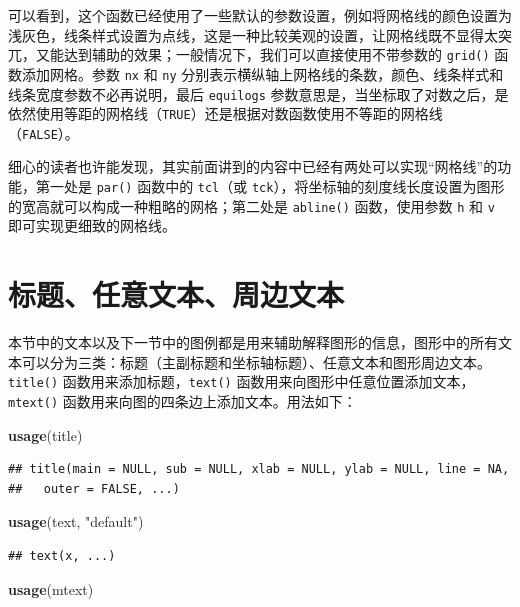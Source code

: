 \documentclass[
  b5paper,
  UTF8,twoside]{book}
\newenvironment{Shaded}{\begin{snugshade}}{\end{snugshade}}
\newcommand{\FunctionTok}[1]{\textcolor[rgb]{0.13,0.29,0.53}{\textbf{#1}}}
\newcommand{\NormalTok}[1]{#1}
\newcommand{\StringTok}[1]{\textcolor[rgb]{0.31,0.60,0.02}{#1}}
\begin{document}
可以看到，这个函数已经使用了一些默认的参数设置，例如将网格线的颜色设置为浅灰色，线条样式设置为点线，这是一种比较美观的设置，让网格线既不显得太突兀，又能达到辅助的效果；一般情况下，我们可以直接使用不带参数的 \texttt{grid()} 函数添加网格。参数 \texttt{nx} 和 \texttt{ny} 分别表示横纵轴上网格线的条数，颜色、线条样式和线条宽度参数不必再说明，最后 \texttt{equilogs} 参数意思是，当坐标取了对数之后，是依然使用等距的网格线（\texttt{TRUE}）还是根据对数函数使用不等距的网格线（\texttt{FALSE}）。

细心的读者也许能发现，其实前面讲到的内容中已经有两处可以实现``网格线''的功能，第一处是 \texttt{par()} 函数中的 \texttt{tcl}（或 \texttt{tck}），将坐标轴的刻度线长度设置为图形的宽高就可以构成一种粗略的网格；第二处是 \texttt{abline()} 函数，使用参数 \texttt{h} 和 \texttt{v} 即可实现更细致的网格线。

\section{标题、任意文本、周边文本}\label{sec:text}

本节中的文本以及下一节中的图例都是用来辅助解释图形的信息，图形中的所有文本可以分为三类：标题（主副标题和坐标轴标题）、任意文本和图形周边文本。\texttt{title()} 函数用来添加标题，\texttt{text()} 函数用来向图形中任意位置添加文本，\texttt{mtext()} 函数用来向图的四条边上添加文本。用法如下：

\begin{Shaded}
\begin{Highlighting}[]
\FunctionTok{usage}\NormalTok{(title)}
\end{Highlighting}
\end{Shaded}

\begin{verbatim}
## title(main = NULL, sub = NULL, xlab = NULL, ylab = NULL, line = NA,
##   outer = FALSE, ...)
\end{verbatim}

\begin{Shaded}
\begin{Highlighting}[]
\FunctionTok{usage}\NormalTok{(text, }\StringTok{"default"}\NormalTok{)}
\end{Highlighting}
\end{Shaded}

\begin{verbatim}
## text(x, ...)
\end{verbatim}

\begin{Shaded}
\begin{Highlighting}[]
\FunctionTok{usage}\NormalTok{(mtext)}
\end{Highlighting}
\end{Shaded}
\end{document}
